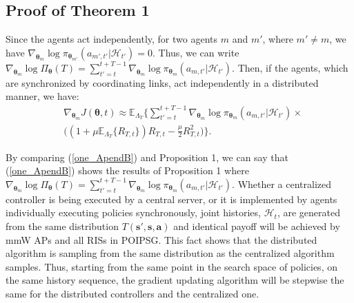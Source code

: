 \documentclass[conference]{IEEEtran}
\begin{document}
\subsection{Proof of Theorem 1}
Since the agents act independently, for two agents $m$ and $m'$, where $m'\neq m$, we have $\nabla_{\boldsymbol{\theta}_{m}} \log\pi_{\boldsymbol{\theta}_{m'}}(a_{m',t'}|\mathcal{H}_{t'})=0$. Thus, we can write $\nabla_{\boldsymbol{\theta}_m}\log\Pi_{\boldsymbol{\theta}}(T)=\sum_{t'=t}^{t+T-1} \nabla_{\boldsymbol{\theta}_m} \log\pi_{\boldsymbol{\theta}_m}(a_{m,t'}|\mathcal{H}_{t'})$. Then, if the agents, which are synchronized by coordinating links, act independently in a distributed manner, we have:
\begin{align}
&\nabla_{\boldsymbol{\theta}_m} J(\boldsymbol{\theta},t) \approx
 \mathbb{E}_{\Lambda_{T}}\{  \sum_{t'=t}^{t+T-1} \nabla_{\boldsymbol{\theta}_m} \log\pi_{\boldsymbol{\theta}_m}(a_{m,t'}|\mathcal{H}_{t'})  \times \label{one_ApendB}
   \nonumber \\ &
  \big((1+\mu \mathbb{E}_{\Lambda_{T}}\{R_{T,t}\}) R_{T,t}-\frac{\mu}{2}R_{T,t}^2\big)\}.
\end{align}

By comparing (\ref{one_ApendB}) and Proposition 1, we can say that (\ref{one_ApendB}) shows the results of Proposition 1 where $\nabla_{\boldsymbol{\theta}_m}\log\Pi_{\boldsymbol{\theta}}(T)=\sum_{t'=t}^{t+T-1} \nabla_{\boldsymbol{\theta}_m} \log\pi_{\boldsymbol{\theta}_m}(a_{m,t'}|\mathcal{H}_{t'})$. Whether a centralized controller is being executed by a central server, or it is implemented by agents individually executing policies synchronously, joint histories, $\mathcal{H}_t$, are generated from the same distribution $T(\boldsymbol{s}',\boldsymbol{s},\boldsymbol{a})$ and identical payoff will be achieved by mmW APs and all RISs in POIPSG. This fact shows that the distributed algorithm is sampling from the same distribution as the centralized algorithm samples. Thus, starting from the same point in the search space of policies, on the same history sequence, the gradient updating algorithm will be stepwise the same for the distributed controllers and the centralized one.
\end{document}
